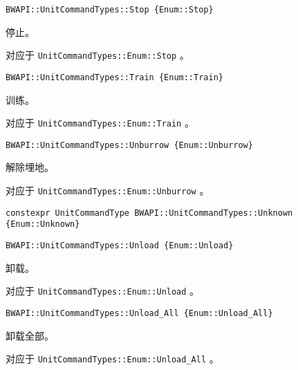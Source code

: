 \begin{tcolorbox}[colback=white, colframe=black!60!white, title=Stop\{\}, arc=0mm]
\begin{verbatim}
BWAPI::UnitCommandTypes::Stop {Enum::Stop}
\end{verbatim}
停止。\par 对应于   \verb|UnitCommandTypes::Enum::Stop|  。
\end{tcolorbox}


\begin{tcolorbox}[colback=white, colframe=black!60!white, title=Train\{\}, arc=0mm]
\begin{verbatim}
BWAPI::UnitCommandTypes::Train {Enum::Train}
\end{verbatim}
训练。\par 对应于   \verb|UnitCommandTypes::Enum::Train|  。
\end{tcolorbox}


\begin{tcolorbox}[colback=white, colframe=black!60!white, title=Unburrow\{\}, arc=0mm]
\begin{verbatim}
BWAPI::UnitCommandTypes::Unburrow {Enum::Unburrow}
\end{verbatim}
解除埋地。\par 对应于   \verb|UnitCommandTypes::Enum::Unburrow|  。
\end{tcolorbox}


\begin{tcolorbox}[colback=white, colframe=black!60!white, title=Unknown\{\}, arc=0mm]
\begin{verbatim}
constexpr UnitCommandType BWAPI::UnitCommandTypes::Unknown {Enum::Unknown}
\end{verbatim}
\end{tcolorbox}


\begin{tcolorbox}[colback=white, colframe=black!60!white, title=Unload\{\}, arc=0mm]
\begin{verbatim}
BWAPI::UnitCommandTypes::Unload {Enum::Unload}
\end{verbatim}
卸载。\par 对应于   \verb|UnitCommandTypes::Enum::Unload|  。
\end{tcolorbox}


\begin{tcolorbox}[colback=white, colframe=black!60!white, title=Unload\_All\{\}, arc=0mm]
\begin{verbatim}
BWAPI::UnitCommandTypes::Unload_All {Enum::Unload_All}
\end{verbatim}
卸载全部。\par 对应于   \verb|UnitCommandTypes::Enum::Unload_All|  。
\end{tcolorbox}


